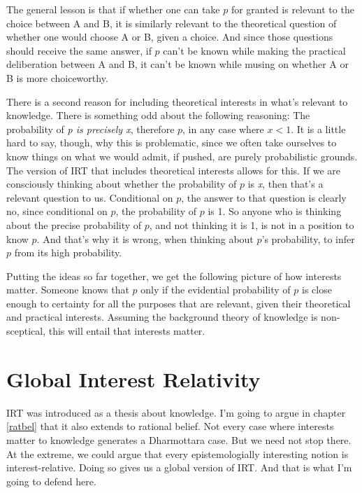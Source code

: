 \documentclass[11pt,]{book}
\begin{document}
The general lesson is that if whether one can take \(p\) for granted is relevant to the choice between A and B, it is similarly relevant to the theoretical question of whether one would choose A or B, given a choice. And since those questions should receive the same answer, if \(p\) can't be known while making the practical deliberation between A and B, it can't be known while musing on whether A or B is more choiceworthy.

There is a second reason for including theoretical interests in what's relevant to knowledge. There is something odd about the following reasoning: The probability of \emph{p is precisely x}, therefore \(p\), in any case where \(x < 1\). It is a little hard to say, though, why this is problematic, since we often take ourselves to know things on what we would admit, if pushed, are purely probabilistic grounds. The version of IRT that includes theoretical interests allows for this. If we are consciously thinking about whether the probability of \(p\) is \emph{x}, then that's a relevant question to us. Conditional on \(p\), the answer to that question is clearly no, since conditional on \(p\), the probability of \(p\) is 1. So anyone who is thinking about the precise probability of \(p\), and not thinking it is 1, is not in a position to know \(p\). And that's why it is wrong, when thinking about \(p\)'s probability, to infer \(p\) from its high probability.

Putting the ideas so far together, we get the following picture of how interests matter. Someone knows that \(p\) only if the evidential probability of \(p\) is close enough to certainty for all the purposes that are relevant, given their theoretical and practical interests. Assuming the background theory of knowledge is non-sceptical, this will entail that interests matter.

\hypertarget{global}{%
\section{Global Interest Relativity}\label{global}}

IRT was introduced as a thesis about knowledge. I'm going to argue in chapter \ref{ratbel} that it also extends to rational belief. Not every case where interests matter to knowledge generates a Dharmottara case. But we need not stop there. At the extreme, we could argue that every epistemologially interesting notion is interest-relative. Doing so gives us a global version of IRT. And that is what I'm going to defend here.
\end{document}
